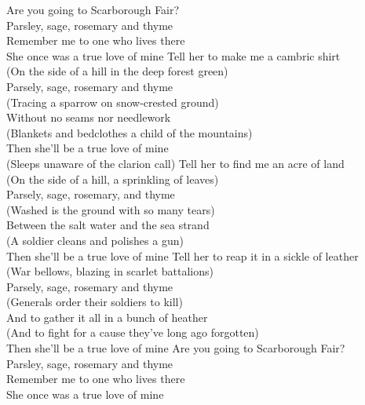 \begin{flushleft}
Are you going to Scarborough Fair? \\
Parsley, sage, rosemary and thyme \\
Remember me to one who lives there \\
She once was a true love of mine 
\vskip 3mm
Tell her to make me a cambric shirt\\
\hspace{0.9cm}(On the side of a hill in the deep forest green)\\
Parsely, sage, rosemary and thyme\\
\hspace{0.9cm}(Tracing a sparrow on snow-crested ground)\\
Without no seams nor needlework\\
\hspace{0.9cm}(Blankets and bedclothes a child of the mountains)\\
Then she'll be a true love of mine\\
\hspace{0.9cm}(Sleeps unaware of the clarion call)
\vskip 3mm
Tell her to find me an acre of land\\
\hspace{0.9cm}(On the side of a hill, a sprinkling of leaves)\\
Parsely, sage, rosemary, and thyme\\
\hspace{0.9cm}(Washed is the ground with so many tears)\\
Between the salt water and the sea strand\\
\hspace{0.9cm}(A soldier cleans and polishes a gun)\\
Then she'll be a true love of mine
\vskip 3mm
Tell her to reap it in a sickle of leather\\
\hspace{0.9cm}(War bellows, blazing in scarlet battalions)\\
Parsely, sage, rosemary and thyme\\
\hspace{0.9cm}(Generals order their soldiers to kill)\\
And to gather it all in a bunch of heather\\
\hspace{0.9cm}(And to fight for a cause they've long ago forgotten)\\
Then she'll be a true love of mine
\vskip 3mm
Are you going to Scarborough Fair?\\
Parsley, sage, rosemary and thyme\\
Remember me to one who lives there\\
She once was a true love of mine 
\end{flushleft}
\newpage